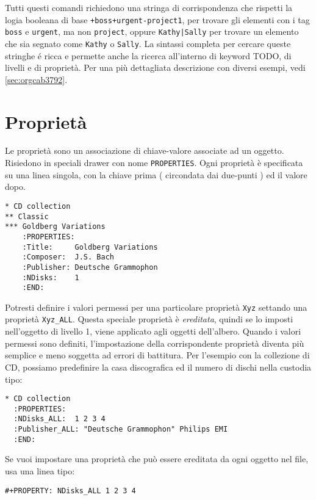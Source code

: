 \documentclass[11pt]{article}
\begin{document}
Tutti questi comandi richiedono una stringa di corrispondenza che
rispetti la logia booleana di base \texttt{+boss+urgent-project1}, per
trovare gli elementi con i tag \texttt{boss} e \texttt{urgent}, ma non \texttt{project},
oppure \texttt{Kathy|Sally} per trovare un elemento che sia segnato come
\texttt{Kathy} o \texttt{Sally}. La sintassi completa per cercare queste stringhe é
ricca e permette anche la ricerca all'interno di keyword TODO, di
livelli e di proprietà. Per una più dettagliata descrizione con
diversi esempi, vedi \ref{sec:orgcab3792}.

\section{Proprietà}
\label{sec:org0c8f5dd}
Le proprietà sono un associazione di chiave-valore associate ad un
oggetto. Risiedono in speciali drawer con nome \texttt{PROPERTIES}. Ogni
proprietà è specificata su una linea singola, con la chiave prima (
circondata dai due-punti ) ed il valore dopo.

\begin{verbatim}
* CD collection
** Classic
*** Goldberg Variations
    :PROPERTIES:
    :Title:     Goldberg Variations
    :Composer:  J.S. Bach
    :Publisher: Deutsche Grammophon
    :NDisks:    1
    :END:
\end{verbatim}

Potresti definire i valori permessi per una particolare proprietà
\texttt{Xyz} settando una proprietà \texttt{Xyz\_ALL}. Questa speciale proprietà è
\emph{ereditata}, quindi se lo imposti nell'oggetto di livello 1, viene
applicato agli oggetti dell'albero. Quando i valori permessi sono
definiti, l'impostazione della corrispondente proprietà diventa più
semplice e meno soggetta ad errori di battitura. Per l'esempio con la
collezione di CD, possiamo predefinire la casa discografica ed il
numero di dischi nella custodia tipo:

\begin{verbatim}
* CD collection
  :PROPERTIES:
  :NDisks_ALL:  1 2 3 4
  :Publisher_ALL: "Deutsche Grammophon" Philips EMI
  :END:
\end{verbatim}

Se vuoi impostare una proprietà che può essere ereditata da ogni
oggetto nel file, usa una linea tipo:

\begin{verbatim}
#+PROPERTY: NDisks_ALL 1 2 3 4
\end{verbatim}
\end{document}
